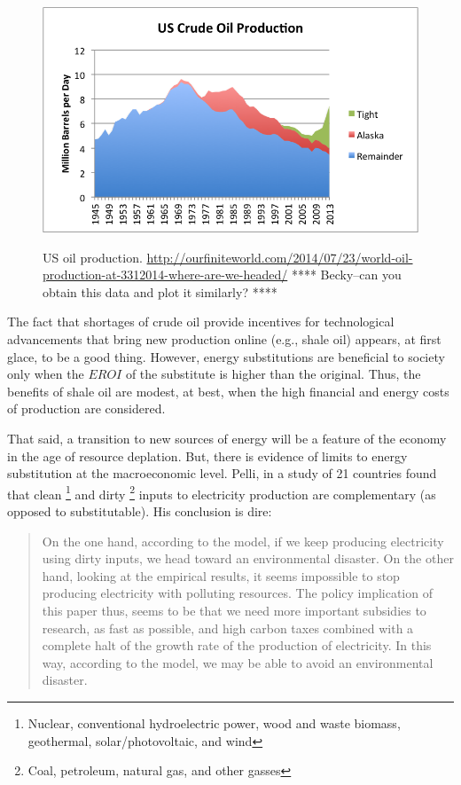 \begin{figure}[!ht]
\centering\
\includegraphics[width=\linewidth]{Part_0/Chapter_Introduction/images/us-crude-oil-production-including-tight-oil.png}
\caption[US oil production]{US oil production.
\url{http://ourfiniteworld.com/2014/07/23/world-oil-production-at-3312014-where-are-we-headed/}
**** Becky--can you obtain this data and plot it similarly? ****
}
\label{fig:US_oil_production}
\end{figure}

The fact that shortages of crude oil provide incentives for 
technological advancements that bring new production online (e.g., shale oil)
appears, at first glace, to be a good thing.
However, energy substitutions are beneficial to society 
only when the $EROI$ of the substitute
is higher than the original.
Thus, the benefits of shale oil are modest, at best, when the
high financial and energy costs of production are considered.

That said, a transition to new sources of energy will be a feature 
of the economy in the age of resource deplation.
But, there is evidence of limits to energy substitution 
at the macroeconomic level.
Pelli, in a study of 21 countries 
found that clean%
	\footnote{
	Nuclear, 
	conventional hydroelectric power, wood and waste biomass, 
	geothermal, solar/photovoltaic, and wind
	}
and dirty%
	\footnote{
	Coal, 
	petroleum, natural gas, and other gasses
	}
inputs to electricity production
are complementary (as opposed to substitutable).\cite{Pelli:2012wv}
His conclusion is dire:
%
\begin{quote}
	On the one hand, according to the model, 
	if we keep producing electricity using dirty inputs, 
	we head toward an environmental disaster. 
	On the other hand, looking at the empirical results, 
	it seems impossible to stop producing electricity with polluting resources. 
	The policy implication of this paper thus, 
	seems to be that we need more important subsidies to research, 
	as fast as possible, 
	and high carbon taxes combined with a complete halt 
	of the growth rate of the production of electricity. 
	In this way, according to the model, 
	we may be able to avoid an environmental disaster.\cite[p.~25]{Pelli:2012wv}
\end{quote}

